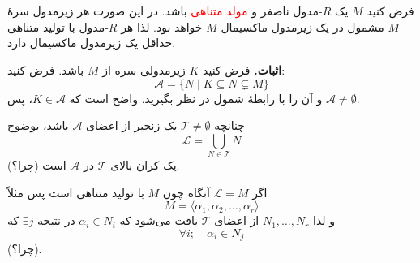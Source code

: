 \section{}



\begin{frame}
    \begin{theorem}
        فرض کنید $M$ یک $R$-مدول ناصفر و \textcolor{red}{مولد متناهی} باشد. در این صورت هر زیرمدول سرهٔ $M$ مشمول در یک زیرمدول ماکسیمال $M$ خواهد بود. لذا هر $R$-مدول با تولید متناهی حداقل یک زیرمدول ماکسیمال دارد.

    \end{theorem}
    \textbf{اثبات.} فرض کنید $K$ زیرمدولی سره از $M$ باشد. فرض کنید:
    \[
        \mathcal{A} = \{ N \mid K \subseteq N \subsetneq M \}
    \]
    و آن را با رابطهٔ شمول در نظر بگیرید. واضح است که
    $K \in \mathcal{A}$،
    پس
    $\mathcal{A} \neq \emptyset$.

    چنانچه
    $\mathcal{T} \neq \emptyset$
    یک زنجیر از اعضای
    $\mathcal{A}$
    باشد، بوضوح
    \[
        \mathcal{L} = \bigcup_{N \in \mathcal{T}} N
    \]
    یک کران بالای
    \(\mathcal{T}\)
    در $\mathcal{A}$ است (چرا؟).



\end{frame}


\begin{frame}
    اگر
    \(\mathcal{L} = M\)
    آنگاه چون
    \(M\)
    با تولید متناهی است پس مثلاً
    \[
        M = \langle \alpha_1, \alpha_2, \dots, \alpha_r \rangle
    \]
    و لذا
    $N_1, \dots, N_r$
    از اعضای
    $\mathcal{T}$
    یافت می‌شود که
    $\alpha_i \in N_i$
    در نتیجه
    $\exists j$
    که
    \[
        \forall i; \quad  \alpha_i \in N_j
    \]
    (چرا؟).

\end{frame}


